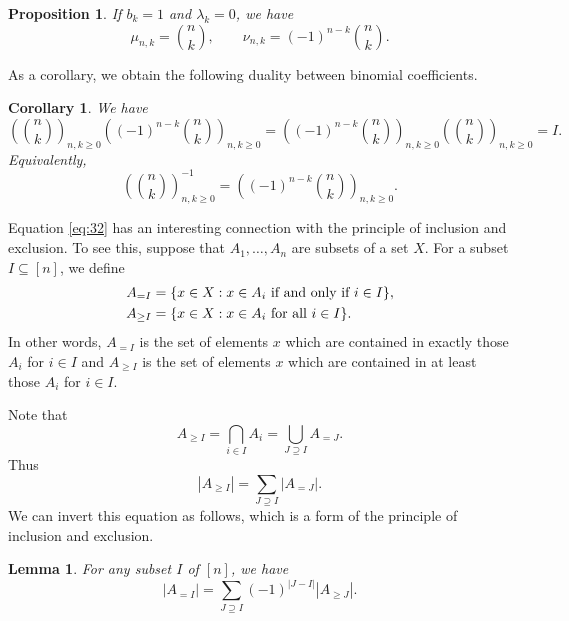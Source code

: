\documentclass[oneside]{book}
\numberwithin{equation}{section}
\newtheorem{lem}[thm]{Lemma}
\newtheorem{prop}[thm]{Proposition}
\newtheorem{cor}[thm]{Corollary}
\theoremstyle{definition}
\begin{document}
\begin{prop}
  If \( b_k=1 \) and \( \lambda_k=0 \), we have
\[
  \mu_{n,k} = \binom{n}{k}, \qquad 
  \nu_{n,k} = (-1)^{n-k} \binom{n}{k}.
\]
\end{prop}



As a corollary, we obtain the following duality between binomial
coefficients.

\begin{cor}\label{cor:2}
  We have
  \[
    \left( \binom{n}{k} \right)_{n,k\ge0}  \left( (-1)^{n-k} \binom{n}{k} \right)_{n,k\ge0}
    = 
    \left( (-1)^{n-k} \binom{n}{k} \right)_{n,k\ge0}
    \left( \binom{n}{k} \right)_{n,k\ge0}
    = I.
  \]
  Equivalently,
  \begin{equation}\label{eq:32}
  \left( \binom{n}{k} \right)_{n,k\ge0}^{-1} = 
  \left( (-1)^{n-k} \binom{n}{k} \right)_{n,k\ge0}.
\end{equation}
\end{cor}

Equation \eqref{eq:32} has an interesting connection with the
principle of inclusion and exclusion. To see this, suppose that
\( A_1,\dots,A_n \) are subsets of a set \( X \).
For a subset \( I \subseteq [n] \), we define
\begin{align*}
  A_{=I} &= \{ x\in X: x\in A_i \mbox{ if and only if \( i\in I \)}\},\\
  A_{\ge I} &= \{ x\in X: x\in A_i \mbox{ for all \( i\in I \)}\}.
\end{align*}
In other words, \( A_{=I} \) is the set of elements \( x \) which are
contained in exactly those \( A_i \) for \( i\in I \) and
\( A_{\ge I} \) is the set of elements \( x \) which are contained in
at least those \( A_i \) for \( i\in I \).

Note that 
\[
  A_{\ge I} = \bigcap_{i\in I} A_i = \bigcup_{J\supseteq I} A_{=J}.
\]
Thus
\begin{equation}\label{eq:33}
  \left| A_{\ge I} \right| = \sum_{J\supseteq I}  \left| A_{=J} \right|.
\end{equation}
We can invert this equation as follows, which is a form of the
principle of inclusion and exclusion.

\begin{lem}
  For any subset \( I \) of \( [n] \), we have
  \begin{equation}\label{eq:34}
  \left| A_{= I} \right| = \sum_{J\supseteq I} (-1)^{|J-I|}  \left| A_{\ge J} \right|.
\end{equation}
\end{lem}
\end{document}
